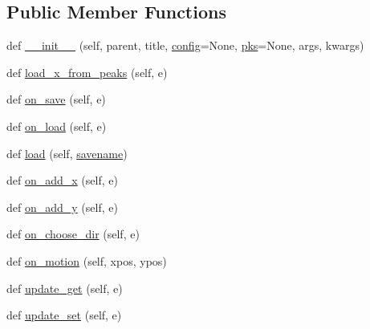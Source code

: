 \subsection*{Public Member Functions}
\begin{DoxyCompactItemize}
\item 
def \hyperlink{class_uni_dec_1_1datacollector_1_1_data_collector_abd503261078a47fab0881a9cde2e6628}{\+\_\+\+\_\+init\+\_\+\+\_\+} (self, parent, title, \hyperlink{class_uni_dec_1_1datacollector_1_1_data_collector_a1a12326c0ea9260b0f8085d3a9219717}{config}=None, \hyperlink{class_uni_dec_1_1datacollector_1_1_data_collector_a83efe336d14f25ae05b8732cd6a1438a}{pks}=None, args, kwargs)
\item 
def \hyperlink{class_uni_dec_1_1datacollector_1_1_data_collector_a347f40a3a407e6b1bb60dab310ee453d}{load\+\_\+x\+\_\+from\+\_\+peaks} (self, e)
\item 
def \hyperlink{class_uni_dec_1_1datacollector_1_1_data_collector_a06e6d8e6bc978e9f0db170c7c45d4a99}{on\+\_\+save} (self, e)
\item 
def \hyperlink{class_uni_dec_1_1datacollector_1_1_data_collector_af98fcc642854467c45010a5175f5bcad}{on\+\_\+load} (self, e)
\item 
def \hyperlink{class_uni_dec_1_1datacollector_1_1_data_collector_a023d2c1a82e946c953543deecd51adb4}{load} (self, \hyperlink{class_uni_dec_1_1datacollector_1_1_data_collector_aa84278af5c37d84afe22d415eb5efe81}{savename})
\item 
def \hyperlink{class_uni_dec_1_1datacollector_1_1_data_collector_a451883537c40095af8c5bcf496bda102}{on\+\_\+add\+\_\+x} (self, e)
\item 
def \hyperlink{class_uni_dec_1_1datacollector_1_1_data_collector_a6c1769352a685815cbeb4b2e282de00e}{on\+\_\+add\+\_\+y} (self, e)
\item 
def \hyperlink{class_uni_dec_1_1datacollector_1_1_data_collector_afb74bfc2dcd2bb3c42b54014d57a0a9a}{on\+\_\+choose\+\_\+dir} (self, e)
\item 
def \hyperlink{class_uni_dec_1_1datacollector_1_1_data_collector_aa552e535ef934a53221fc619159a13ed}{on\+\_\+motion} (self, xpos, ypos)
\item 
def \hyperlink{class_uni_dec_1_1datacollector_1_1_data_collector_a6e45a65240a5620ed64ae4a9d677f995}{update\+\_\+get} (self, e)
\item 
def \hyperlink{class_uni_dec_1_1datacollector_1_1_data_collector_ab45e8770a6382c15bfc82039034f7f97}{update\+\_\+set} (self, e)
\item 

\end{DoxyCompactItemize}
